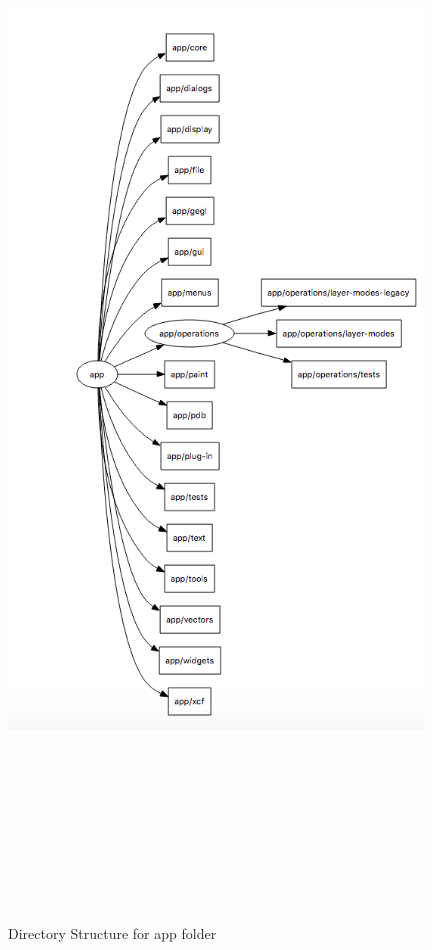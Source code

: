 \begin{figure}
\centering
\includegraphics[width=11cm,height=100cm,keepaspectratio]{appfolder.png}
\caption{\label{fig:appfolder}Directory Structure for app folder}
\end{figure}
